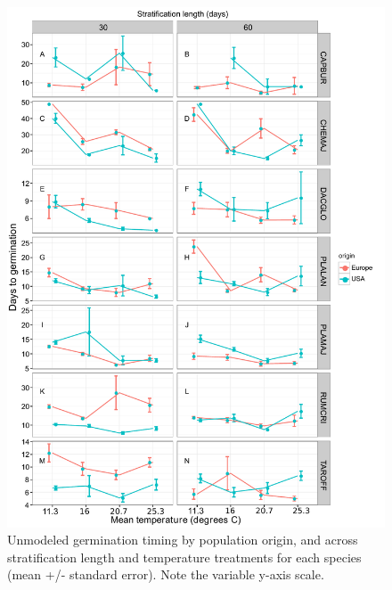 \documentclass[12pt]{article}\usepackage[]{graphicx}\usepackage[]{color}
\begin{document}
\begin{figure}[H]
  \centering
  \includegraphics[scale=.9]{figure7} 
  \caption{Unmodeled germination timing by population origin, and across stratification length and temperature treatments for   each species (mean +/- standard error). Note the variable y-axis scale.} \label{fig:rawtime} 
\end{figure}
\end{document}
